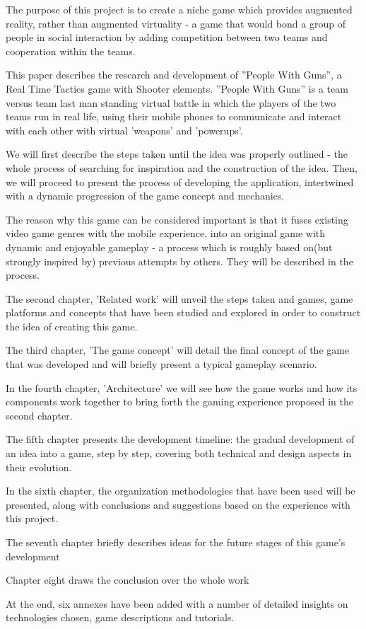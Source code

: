 The purpose of this project is to create a niche game which provides augmented
reality, rather than augmented virtuality - a game that would bond a group of
people in social interaction by adding competition between two teams and
cooperation within the teams.\newline

This paper describes the research and development of ''People With Guns'', a
Real Time Tactics game with Shooter elements. ''People With
Guns'' is a team versus team last man standing virtual battle in which the
players of the two teams run in real life, using their mobile phones to
communicate and interact with each other with virtual 'weapons' and
'powerups'.\newline

We will first describe the steps taken until the idea was properly outlined -
the whole process of searching for inspiration and the construction of the idea.
Then, we will proceed to present the process of developing the application,
intertwined with a dynamic progression of the game concept and
mechanics.\newline

The reason why this game can be considered important is that it fuses existing
video game genres with the mobile experience, into an original game with dynamic
and enjoyable gameplay - a process which is roughly based on(but strongly
inspired by) previous attempts by others. They will be described in the
process.\newline

The second chapter, 'Related work' will unveil the steps taken and games, game
platforms and concepts that have been studied and explored in order to
construct the idea of creating this game.\newline

The third chapter, 'The game concept' will detail the final concept of the game
that was developed and will briefly present a typical gameplay scenario.\newline

In the fourth chapter, 'Architecture' we will see how the game works and how its
components work together to bring forth the gaming experience proposed in the
second chapter.\newline

The fifth chapter presents the development timeline: the gradual development of
an idea into a game, step by step, covering both technical and design aspects in
their evolution.\newline

In the sixth chapter, the organization methodologies that have been used will be
presented, along with conclusions and suggestions based on the experience with
this project.\newline

The seventh chapter briefly describes ideas for the future stages of this game's
development\newline

Chapter eight draws the conclusion over the whole work\newline

At the end, six annexes have been added with a number of detailed insights on
technologies chosen, game descriptions and tutorials.